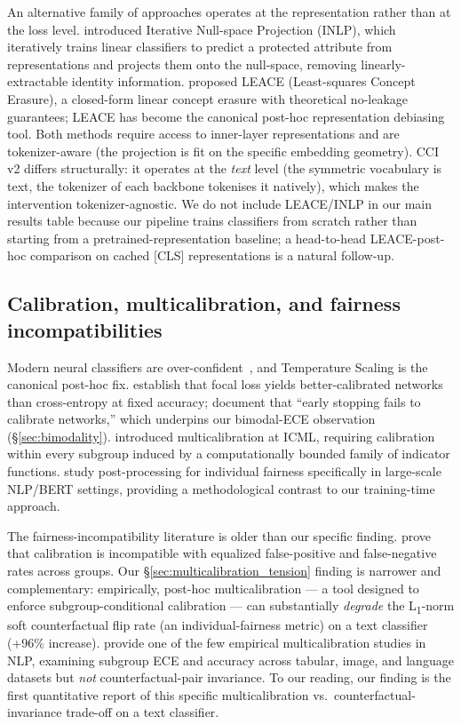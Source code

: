 An alternative family of approaches operates at the representation rather than at the loss level. \citet{ravfogel2020null} introduced Iterative Null-space Projection (INLP), which iteratively trains linear classifiers to predict a protected attribute from representations and projects them onto the null-space, removing linearly-extractable identity information. \citet{belrose2023leace} proposed LEACE (Least-squares Concept Erasure), a closed-form linear concept erasure with theoretical no-leakage guarantees; LEACE has become the canonical post-hoc representation debiasing tool. Both methods require access to inner-layer representations and are tokenizer-aware (the projection is fit on the specific embedding geometry). CCI v2 differs structurally: it operates at the \emph{text} level (the symmetric vocabulary is text, the tokenizer of each backbone tokenises it natively), which makes the intervention tokenizer-agnostic. We do not include LEACE/INLP in our main results table because our pipeline trains classifiers from scratch rather than starting from a pretrained-representation baseline; a head-to-head LEACE-post-hoc comparison on cached [CLS] representations is a natural follow-up.

\subsection{Calibration, multicalibration, and fairness incompatibilities}
\label{sec:related:calibration}

Modern neural classifiers are over-confident~\citep{guo2017calibration}, and Temperature Scaling is the canonical post-hoc fix. \citet{mukhoti2020calibrating} establish that focal loss yields better-calibrated networks than cross-entropy at fixed accuracy; \citet{tao2023pcs} document that ``early stopping fails to calibrate networks,'' which underpins our bimodal-ECE observation (\S\ref{sec:bimodality}). \citet{hebertjohnson2018multicalibration} introduced multicalibration at ICML, requiring calibration within every subgroup induced by a computationally bounded family of indicator functions. \citet{petersen2021post} study post-processing for individual fairness specifically in large-scale NLP/BERT settings, providing a methodological contrast to our training-time approach.

The fairness-incompatibility literature is older than our specific finding. \citet{pleiss2017fairness} prove that calibration is incompatible with equalized false-positive and false-negative rates across groups. Our \S\ref{sec:multicalibration_tension} finding is narrower and complementary: empirically, post-hoc multicalibration --- a tool designed to enforce subgroup-conditional calibration --- can substantially \emph{degrade} the L\textsubscript{1}-norm soft counterfactual flip rate (an individual-fairness metric) on a text classifier (+96\% increase). \citet{hansen2024multicalibration} provide one of the few empirical multicalibration studies in NLP, examining subgroup ECE and accuracy across tabular, image, and language datasets but \emph{not} counterfactual-pair invariance. To our reading, our finding is the first quantitative report of this specific multicalibration vs.\ counterfactual-invariance trade-off on a text classifier.

